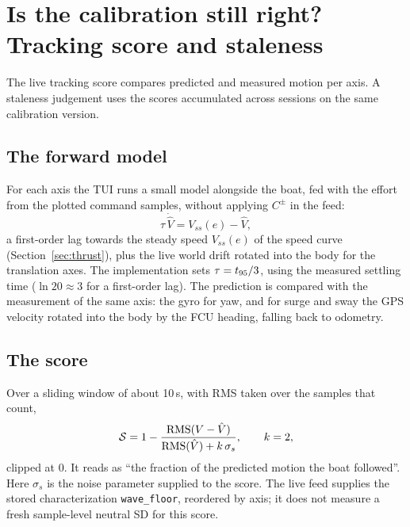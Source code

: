 \section{Is the calibration still right? Tracking score and staleness}
\label{sec:corr-track}

The live tracking score compares predicted and measured motion per axis.
A staleness judgement uses the scores accumulated across sessions on the same
calibration version.

\subsection{The forward model}

For each axis the TUI runs a small model alongside the boat, fed with the effort
from the plotted command samples, without applying $C^\pm$ in the feed:
\[
  \tau\,\dot{\hat V} = V_{ss}(e) - \hat V ,
\]
a first-order lag towards the steady speed $V_{ss}(e)$ of the speed curve
(Section~\ref{sec:thrust}), plus the live world drift rotated into the body for
the translation axes. The implementation sets $\tau=t_{95}/3$, using the measured settling time
($\ln20\approx3$ for a first-order lag). The prediction is compared with the measurement of the
same axis: the gyro for yaw, and for surge and sway the GPS velocity rotated into
the body by the FCU heading, falling back to odometry.

\subsection{The score}

Over a sliding window of about 10\,s, with RMS taken over the samples that count,
\[
  \mathcal{S} = 1 - \frac{\operatorname{RMS}(V - \hat V)}{\operatorname{RMS}(\hat V) + k\,\sigma_{s}},
  \qquad k = 2,
\]
clipped at $0$. It reads as ``the fraction of the predicted motion the boat
followed''. Here $\sigma_s$ is the noise parameter supplied to the score. The live
feed supplies the stored characterization \texttt{wave\_floor}, reordered by
axis; it does not measure a fresh sample-level neutral SD for this score.

